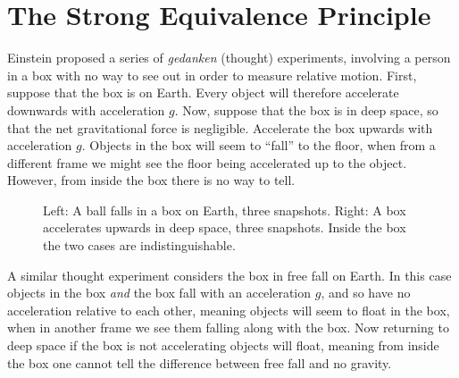 \documentclass[fleqn]{NotesClass}
\begin{document}
    \section{The Strong Equivalence Principle}
    Einstein proposed a series of \textit{gedanken} (thought) experiments, involving a person in a box with no way to see out in order to measure relative motion.
    First, suppose that the box is on Earth.
    Every object will therefore accelerate downwards with acceleration \(g\).
    Now, suppose that the box is in deep space, so that the net gravitational force is negligible.
    Accelerate the box upwards with acceleration \(g\).
    Objects in the box will seem to \enquote{fall} to the floor, when from a different frame we might see the floor being accelerated up to the object.
    However, from inside the box there is no way to tell.
    
    \begin{figure}
        \caption[Einstein's \textit{gedanken} experiments.]{Left: A ball falls in a box on Earth, three snapshots. Right: A box accelerates upwards in deep space, three snapshots. Inside the box the two cases are indistinguishable.}
    \end{figure}
    
    A similar thought experiment considers the box in free fall on Earth.
    In this case objects in the box \emph{and} the box fall with an acceleration \(g\), and so have no acceleration relative to each other, meaning objects will seem to float in the box, when in another frame we see them falling along with the box.
    Now returning to deep space if the box is not accelerating objects will float, meaning from inside the box one cannot tell the difference between free fall and no gravity.
    
\end{document}
